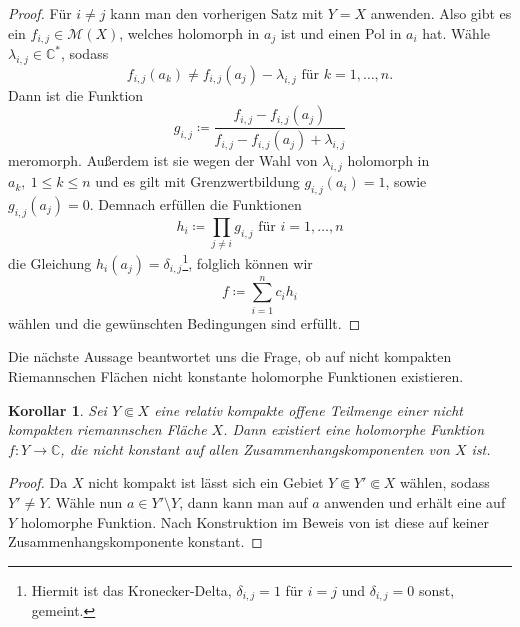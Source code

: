\documentclass[11pt,a4paper,toc=bibliography]{scrartcl}
\theoremstyle{thm}
\newtheorem{koro}{Korollar}[section]
\theoremstyle{def}
\theoremstyle{remark}
\begin{document}
\begin{proof}
Für $i\neq j$ kann man den vorherigen Satz mit $Y=X$ anwenden. Also gibt es ein $f_{i,j}\in\mathcal{M}(X)$, welches holomorph in $a_j$ ist und einen Pol in $a_i$ hat. Wähle $\lambda_{i,j}\in \mathbb{C}^*$, sodass 
\[
f_{i,j}(a_k) \neq f_{i,j}(a_j)-\lambda_{i,j} \text{ für } k=1,\ldots,n.
\]
Dann ist die Funktion 
\[
g_{i,j}\coloneqq \frac{f_{i,j}-f_{i,j}(a_j)}{f_{i,j}-f_{i,j}(a_j)+\lambda_{i,j}}
\]
meromorph. Außerdem ist sie wegen der Wahl von $\lambda_{i,j}$ holomorph in $a_k,~1\leq k\leq n$ und es gilt mit Grenzwertbildung $g_{i,j}(a_i)=1$, sowie $g_{i,j}(a_j)=0.$
Demnach erfüllen die Funktionen
\[
h_i\coloneqq \prod_{j\neq i} g_{i,j} \text{ für } i=1,\ldots,n
\]
die Gleichung $h_i(a_j)=\delta_{i,j}$\footnote{
Hiermit ist das Kronecker-Delta, $\delta_{i,j}=1$ für $i=j$ und $\delta_{i,j}=0$ sonst, gemeint.
}, folglich können wir 
\[
f \coloneqq \sum_{i=1}^{n}c_i h_i
\]
wählen und die gewünschten Bedingungen sind erfüllt.
\end{proof}
Die nächste Aussage beantwortet uns die Frage, ob auf nicht kompakten Riemannschen Flächen nicht konstante holomorphe Funktionen existieren.
\begin{koro}
Sei $Y\Subset X$ eine relativ kompakte offene Teilmenge einer nicht kompakten riemannschen Fläche $X$. Dann existiert eine holomorphe Funktion $f:Y\rightarrow \mathbb{C}$, die nicht konstant auf allen Zusammenhangskomponenten von $X$ ist.
\end{koro}
\begin{proof}
Da $X$ nicht kompakt ist lässt sich ein Gebiet $Y\Subset Y'\Subset X$ wählen, sodass $Y'\neq Y$. Wähle nun $a\in Y'\setminus Y$, dann kann man  auf $a$ anwenden und erhält eine auf $Y$ holomorphe Funktion. Nach Konstruktion im Beweis von  ist diese auf keiner Zusammenhangskomponente konstant.
\end{proof}
\end{document}
